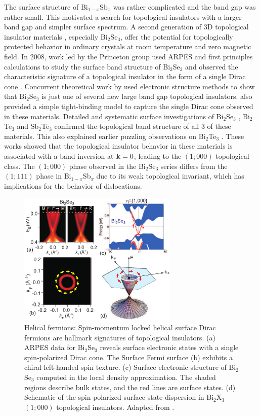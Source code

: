 \documentclass[twocolumn,floatfix,showpacs,rmp,aps]{revtex4}
\begin{document}
The surface structure of Bi$_{1-x}$Sb$_x$ was
rather complicated and the band gap was rather small.  This
motivated a search for topological insulators with a larger band gap
and simpler surface spectrum.
A second generation of 3D
topological insulator materials \cite{moore09}, especially Bi$_2$Se$_3$, offer the
potential for topologically protected behavior in ordinary crystals
at room temperature and zero magnetic field.
In 2008, work led by the Princeton group used ARPES and
first principles calculations to study the surface band structure of
Bi$_2$Se$_3$ and observed the characteristic signature of a
topological insulator in the form of a single Dirac cone \cite{xia09a}.
Concurrent theoretical work by \textcite{zhangh09}
used electronic structure methods to show that
Bi$_2$Se$_3$ is just one of several new large band gap topological
insulators. \textcite{zhangh09} also provided a simple tight-binding
model to capture the single Dirac cone observed in these materials.
Detailed and systematic surface
investigations of Bi$_2$Se$_3$ \cite{hsieh09b,hor09,park10}, Bi$_2$Te$_3$
\cite{chen09,hsieh09b,hsieh09c,xia09b} and  Sb$_2$Te$_3$ \cite{hsieh09c}
confirmed the topological band structure of all 3 of these materials.
This also explained earlier
puzzling observations on Bi$_2$Te$_3$ \cite{noh08}.
These works showed that the topological insulator behavior in
these materials is associated with a band inversion at ${\bf k}=0$, leading to
the $(1;000)$ topological class.
The $(1;000)$ phase observed in the Bi$_2$Se$_3$ series
differs from the $(1;111)$ phase in Bi$_{1-x}$Sb$_x$ due to its
weak topological invariant, which has implications for the behavior
of dislocations\cite{ran09}.

\begin{figure}
\includegraphics[width=3in]{Fig12}
\caption{\label{fig:zfig4}
Helical fermions: Spin-momentum
locked helical surface Dirac fermions are hallmark signatures of
topological insulators.  (a) ARPES data for Bi$_2$Se$_3$ reveals
surface electronic states with a single
spin-polarized Dirac cone. The Surface Fermi surface (b) exhibits a chiral
left-handed spin texture.  (c) Surface electronic structure of
Bi$_2$Se$_3$ computed in the local density approximation.  The shaded
regions describe bulk states, and the red lines are surface states.
(d) Schematic of the spin polarized surface state dispersion in
Bi$_2$X$_3$ $(1;000)$ topological insulators.  Adapted from .}
\end{figure}
\end{document}
